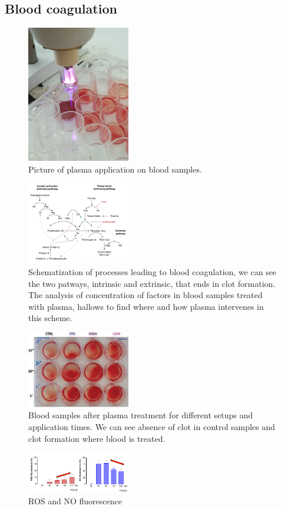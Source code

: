 \subsection{Blood coagulation}

\begin{figure}
 \centering
 \includegraphics[width=0.4\textwidth]{Images/Intro/source_application.png}
 \caption{Picture of plasma application on blood samples.}
 \label{fig:plasmaapp}
\end{figure}

\begin{figure}
 \centering
 \includegraphics[width=0.4\textwidth]{Images/Intro/coag_map.png}
 \caption{Schematization of processes leading to blood coagulation, we can see the two patways, intrinsic and extrinsic, that ends in clot formation. The analysis of concentration of factors in blood samples treated with plasma, hallows to find where and how plasma intervenes in this scheme.}
 \label{fig:coag}
\end{figure}

\begin{figure}
 \centering
 \includegraphics[width=0.4\textwidth]{Images/Intro/blood_sample.png}
 \caption{Blood samples after plasma treatment for different setups and application times. We can see absence of clot in control samples and clot formation where blood is treated.}
 \label{fig:samples}
\end{figure}

\begin{figure}
 \centering
 \includegraphics[width=0.4\textwidth]{Images/Intro/ROS.png}
 \caption{ROS and NO fluorescence }
 \label{fig:samples}
\end{figure}
